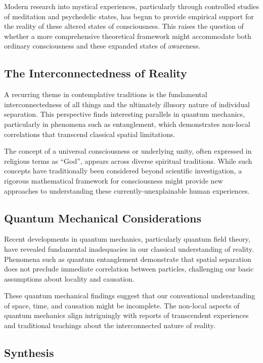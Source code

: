 \documentclass{article}
\theoremstyle{definition}
\theoremstyle{axiom}
\theoremstyle{theorem}
\theoremstyle{lemma}
\theoremstyle{proposition}
\begin{document}
Modern research into mystical experiences, particularly through controlled studies of meditation and psychedelic states, has begun to provide empirical support for the reality of these altered states of consciousness. This raises the question of whether a more comprehensive theoretical framework might accommodate both ordinary consciousness and these expanded states of awareness.

\subsection{The Interconnectedness of Reality}

A recurring theme in contemplative traditions is the fundamental interconnectedness of all things and the ultimately illusory nature of individual separation. This perspective finds interesting parallels in quantum mechanics, particularly in phenomena such as entanglement, which demonstrates non-local correlations that transcend classical spatial limitations.

The concept of a universal consciousness or underlying unity, often expressed in religious terms as \enquote{God}, appears across diverse spiritual traditions. While such concepts have traditionally been considered beyond scientific investigation, a rigorous mathematical framework for consciousness might provide new approaches to understanding these currently-unexplainable human experiences.

\subsection{Quantum Mechanical Considerations}

Recent developments in quantum mechanics, particularly quantum field theory, have revealed fundamental inadequacies in our classical understanding of reality. Phenomena such as quantum entanglement demonstrate that spatial separation does not preclude immediate correlation between particles, challenging our basic assumptions about locality and causation.

These quantum mechanical findings suggest that our conventional understanding of space, time, and causation might be incomplete. The non-local aspects of quantum mechanics align intriguingly with reports of transcendent experiences and traditional teachings about the interconnected nature of reality.

\subsection{Synthesis}
\end{document}
